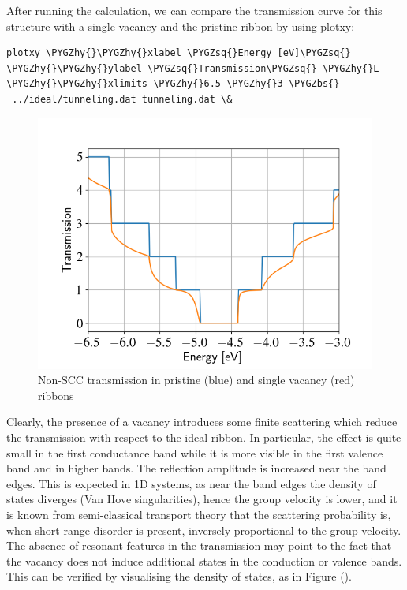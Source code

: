 \documentclass[a4paper,11pt,english]{sphinxmanual}
\def\PYGZbs{\char`\\}
\def\PYGZhy{\char`\-}
\def\PYGZsq{\char`\'}
\renewcommand\PYGZsq{\textquotesingle}
\begin{document}
{{After running the
calculation, we can compare the transmission curve for this structure
with a single vacancy and the pristine ribbon by using plotxy:

\begin{Verbatim}[commandchars=\\\{\}]
plotxy \PYGZhy{}\PYGZhy{}xlabel \PYGZsq{}Energy [eV]\PYGZsq{} \PYGZhy{}\PYGZhy{}ylabel \PYGZsq{}Transmission\PYGZsq{} \PYGZhy{}L \PYGZhy{}\PYGZhy{}xlimits \PYGZhy{}6.5 \PYGZhy{}3 \PYGZbs{}
 ../ideal/tunneling.dat tunneling.dat \&
\end{Verbatim}
\begin{figure}[htbp]
\centering
\capstart
\includegraphics[width=0.700\linewidth]{nonscc-vac-tunn.png}
\caption{Non-SCC transmission in pristine (blue) and single vacancy (red) ribbons}\label{transport:fig-nonscc-vac-tunn}\end{figure}

Clearly, the presence of a vacancy introduces some finite scattering
which reduce the transmission with respect to the ideal ribbon.  In
particular, the effect is quite small in the first conductance band
while it is more visible in the first valence band and in higher
bands.  The reflection amplitude is increased near the band
edges. This is expected in 1D systems, as near the band edges the
density of states diverges (Van Hove singularities), hence the group
velocity is lower, and it is known from semi-classical transport
theory that the scattering probability is, when short range disorder
is present, inversely proportional to the group velocity. The absence
of resonant features in the transmission may point to the fact that
the vacancy does not induce additional states in the conduction or
valence bands. This can be verified by visualising the density of
states, as in Figure {\hyperref[transport:fig-nonscc-vac-dos]{\emph{}}} ().
\begin{figure}[htbp]
\centering
\capstart


\end{figure}}}
\end{document}
